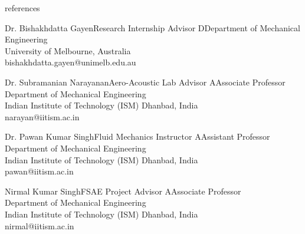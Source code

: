 \documentclass{resume} %
\begin{document}
\begin{rSection}{references}



\begin{rSubsection}{Dr. Bishakhdatta Gayen}{Research Internship Advisor}{}
DDepartment of Mechanical Engineering\\
University of Melbourne, Australia\\
bishakhdatta.gayen@unimelb.edu.au\\

\end{rSubsection}

\begin{rSubsection}{Dr. Subramanian  Narayanan}{Aero-Acoustic Lab Advisor}{}
AAssociate Professor\\
Department of Mechanical Engineering\\
Indian Institute of Technology (ISM) Dhanbad, India\\
narayan@iitism.ac.in\\

\end{rSubsection}
\begin{rSubsection}{Dr. Pawan Kumar Singh}{Fluid Mechanics Instructor}{}
AAssistant Professor\\
Department of Mechanical Engineering\\
Indian Institute of Technology (ISM) Dhanbad, India\\
pawan@iitism.ac.in\\

\end{rSubsection}
\begin{rSubsection}{Nirmal Kumar Singh}{FSAE Project Advisor}{}
AAssociate Professor\\
Department of Mechanical Engineering\\
Indian Institute of Technology (ISM) Dhanbad, India\\
nirmal@iitism.ac.in\\

\end{rSubsection}




\end{rSection}





\end{document}

